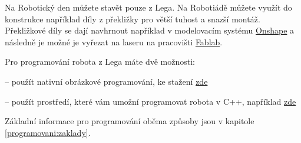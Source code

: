 Na Robotický den můžete stavět pouze z  Lega. 
Na Robotiádě můžete využít do konstrukce například díly z překližky  pro větší tuhost a snazší montáž. 
Překližkové díly se dají navhrnout například v modelovacím systému \href{https://www.onshape.com/}{Onshape}  a následně je možné je vyřezat na laseru na pracovišti \href{https://www.fablabbrno.cz}{Fablab}.

Pro programování robota z Lega máte dvě možnosti: 

-- použít nativní obrázkové programování, ke stažení \href{https://www.lego.com/en-us/mindstorms/downloads}{zde} 

-- použít prostředí, které vám umožní programovat robota v C++, například \href{}{zde} %

Základní informace pro programování oběma způsoby jsou v kapitole \ref{programovani:zaklady}.
 


